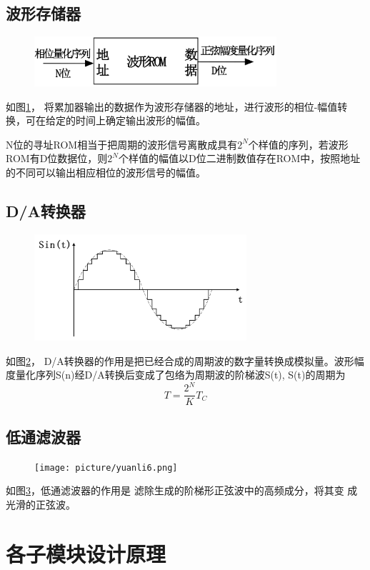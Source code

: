 \documentclass[12pt]{article}
\begin{document}
\subsection{波形存储器}
\begin{figure}[htbp]
	\centering  
	\includegraphics[width=0.8\textwidth]{picture/yuanli3.png}  
	\caption{}  
	\label{fig:yuanli3}   
\end{figure}
如图\ref{fig:yuanli3}，
将累加器输出的数据作为波形存储器的地址，进行波形的相位-幅值转换，可在给定的时间上确定输出波形的幅值。\par N位的寻址ROM相当于把周期的波形信号离散成具有$2^N$个样值的序列，若波形ROM有D位数据位，则$2^N$个样值的幅值以D位二进制数值存在ROM中，按照地址的不同可以输出相应相位的波形信号的幅值。
\subsection{D/A转换器}
\begin{figure}[htbp]
	\centering  
	\includegraphics[width=0.7\textwidth]{picture/yuanli5.png}  
	\caption{}  
	\label{fig:yuanli5}   
\end{figure}
如图\ref{fig:yuanli5}，
D/A转换器的作用是把已经合成的周期波的数字量转换成模拟量。波形幅度量化序列S(n)经D/A转换后变成了包络为周期波的阶梯波S(t), S(t)的周期为$$T=\frac{2^N}{K} T_C$$
\subsection{低通滤波器}
\begin{figure}[htbp]
	\centering  
	\texttt{[image: picture/yuanli6.png]}  
	\caption{}  
	\label{fig:yuanli6}   
\end{figure}
如图\ref{fig:yuanli6}，低通滤波器的作用是
滤除生成的阶梯形正弦波中的高频成分，将其变
成光滑的正弦波。
\section{各子模块设计原理}
\end{document}
